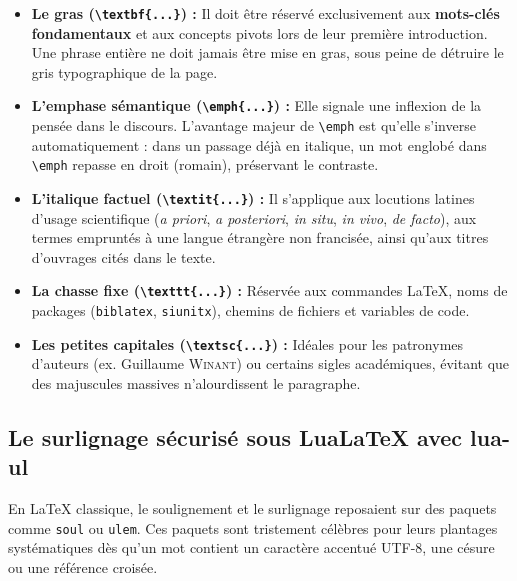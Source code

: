 \begin{itemize}
  \item \textbf{Le gras (\texttt{\textbackslash textbf\{...\}}) :}
  Il doit être réservé exclusivement aux \textbf{mots-clés fondamentaux} et aux concepts pivots lors de leur première introduction.
  Une phrase entière ne doit jamais être mise en gras, sous peine de détruire le gris typographique de la page.
  
  \item \textbf{L'emphase sémantique (\texttt{\textbackslash emph\{...\}}) :}
  Elle signale une inflexion de la pensée dans le discours.
  L'avantage majeur de \texttt{\textbackslash emph} est qu'elle s'inverse automatiquement : dans un passage déjà en italique, un mot englobé dans \texttt{\textbackslash emph} repasse en droit (romain), préservant le contraste.

  \item \textbf{L'italique factuel (\texttt{\textbackslash textit\{...\}}) :}
  Il s'applique aux locutions latines d'usage scientifique (\textit{a priori}, \textit{a posteriori}, \textit{in situ}, \textit{in vivo}, \textit{de facto}), aux termes empruntés à une langue étrangère non francisée, ainsi qu'aux titres d'ouvrages cités dans le texte.

  \item \textbf{La chasse fixe (\texttt{\textbackslash texttt\{...\}}) :}
  Réservée aux commandes \LaTeX{}, noms de packages (\texttt{biblatex}, \texttt{siunitx}), chemins de fichiers et variables de code.

  \item \textbf{Les petites capitales (\texttt{\textbackslash textsc\{...\}}) :}
  Idéales pour les patronymes d'auteurs (ex. Guillaume \textsc{Winant}) ou certains sigles académiques, évitant que des majuscules massives n'alourdissent le paragraphe.
\end{itemize}

\subsection{Le surlignage sécurisé sous Lua\LaTeX{} avec \textsf{lua-ul}}
\label{subsec:surlignage_luaul}

En \LaTeX{} classique, le soulignement et le surlignage reposaient sur des paquets comme \texttt{soul} ou \texttt{ulem}.
Ces paquets sont tristement célèbres pour leurs plantages systématiques dès qu'un mot contient un caractère accentué UTF-8, une césure ou une référence croisée.

